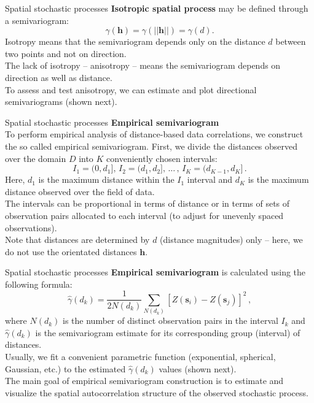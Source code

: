 \documentclass{beamer}
\begin{document}
\begin{frame}{Spatial stochastic processes}
\textbf{Isotropic spatial process} may be defined through a semivariogram:\\  $$\gamma(\bm{h})=\gamma(||\bm{h}||)=\gamma(d).$$ 
Isotropy means that the semivariogram depends only on the distance $d$ between two points and not on direction.\\ \medskip The lack of isotropy -- anisotropy -- means the semivariogram depends on direction as well as distance. \\ \medskip To assess and test anisotropy, we can estimate and plot directional semivariograms (shown next).
\end{frame}
\begin{frame}{Spatial stochastic processes}
\textbf{Empirical semivariogram} \\
To perform empirical analysis of distance-based data correlations, we construct the so called empirical semivariogram. First, we divide the distances observed over the domain $D$ into $K$ conveniently chosen intervals: 
$$I_1 = (0, d_1 ], \, I_2 = (d_1, d_2 ], \, \dots \, , \, I_K = (d_{K-1}, d_K ] \, .$$
Here, $d_1$ is the maximum distance within the $I_1$ interval and $d_K$ is the maximum distance observed over the field of data. \\ \smallskip The intervals can be proportional in terms of distance or in terms of sets of observation pairs allocated to each interval (to adjust for unevenly spaced observations). \\ \smallskip Note that distances are determined by $d$ (distance magnitudes) only -- here, we do not use the orientated distances $\bm{h}$.
\end{frame}
\begin{frame}{Spatial stochastic processes}
\textbf{Empirical semivariogram} is calculated using the following formula:
\begin{equation*}
\hat{\gamma}(d_k) = 
\frac{1}{2N(d_k)} \sum_{N(d_k)}[Z(\bm{s}_i)-Z(\bm{s}_j)]^2 \,,
\end{equation*}
where $N(d_k)$ is the number of distinct observation pairs in the interval $I_k$ and $\hat{\gamma}(d_k)$ is the semivariogram estimate for its corresponding group (interval) of distances. \\
\bigskip
Usually, we fit a convenient parametric function (exponential, spherical, Gaussian, etc.) to the estimated $\hat{\gamma}(d_k)$ values (shown next). \\ 
\bigskip
The main goal of empirical semivariogram construction is to estimate and visualize the spatial autocorrelation structure of the observed stochastic process.
\end{frame}
\end{document}
